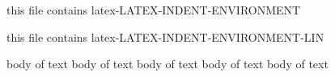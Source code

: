 
this file contains latex-LATEX-INDENT-ENVIRONMENT

this file contains latex-LATEX-INDENT-ENVIRONMENT-LIN

\begin{myenv}
	body of text
	body of text
	body of text
	body of text
	body of text
\end{myenv}
